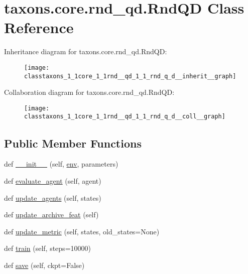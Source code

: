 \hypertarget{classtaxons_1_1core_1_1rnd__qd_1_1_rnd_q_d}{}\section{taxons.\+core.\+rnd\+\_\+qd.\+Rnd\+QD Class Reference}
\label{classtaxons_1_1core_1_1rnd__qd_1_1_rnd_q_d}


Inheritance diagram for taxons.\+core.\+rnd\+\_\+qd.\+Rnd\+QD\+:
\nopagebreak
\begin{figure}[H]
\begin{center}
\leavevmode
\texttt{[image: classtaxons\_1\_1core\_1\_1rnd\_\_qd\_1\_1\_rnd\_q\_d\_\_inherit\_\_graph]}
\end{center}
\end{figure}


Collaboration diagram for taxons.\+core.\+rnd\+\_\+qd.\+Rnd\+QD\+:
\nopagebreak
\begin{figure}[H]
\begin{center}
\leavevmode
\texttt{[image: classtaxons\_1\_1core\_1\_1rnd\_\_qd\_1\_1\_rnd\_q\_d\_\_coll\_\_graph]}
\end{center}
\end{figure}
\subsection*{Public Member Functions}
\begin{DoxyCompactItemize}
\item 
def \hyperlink{classtaxons_1_1core_1_1rnd__qd_1_1_rnd_q_d_a11157322550fd9848888910ccc3f418f}{\+\_\+\+\_\+init\+\_\+\+\_\+} (self, \hyperlink{classtaxons_1_1core_1_1rnd__qd_1_1_rnd_q_d_ac40785dcd2906a6fe7a45e7de8b07a5a}{env}, parameters)
\item 
def \hyperlink{classtaxons_1_1core_1_1rnd__qd_1_1_rnd_q_d_ae374c8d35b2c35ef128f71c4fb2c05ca}{evaluate\+\_\+agent} (self, agent)
\item 
def \hyperlink{classtaxons_1_1core_1_1rnd__qd_1_1_rnd_q_d_a26780a13c5f569edc115dcdad4b5d285}{update\+\_\+agents} (self, states)
\item 
def \hyperlink{classtaxons_1_1core_1_1rnd__qd_1_1_rnd_q_d_a6860d77d8c476530e0ba3969ea01aaa5}{update\+\_\+archive\+\_\+feat} (self)
\item 
def \hyperlink{classtaxons_1_1core_1_1rnd__qd_1_1_rnd_q_d_a382782e03b083fc9149efe64514e5c11}{update\+\_\+metric} (self, states, old\+\_\+states=None)
\item 
def \hyperlink{classtaxons_1_1core_1_1rnd__qd_1_1_rnd_q_d_a464928e3b09c8f2e0a23b51ecf203472}{train} (self, steps=10000)
\item 
def \hyperlink{classtaxons_1_1core_1_1rnd__qd_1_1_rnd_q_d_a638bccdd47f6bcee741f716ed0f6d6b2}{save} (self, ckpt=False)
\end{DoxyCompactItemize}
